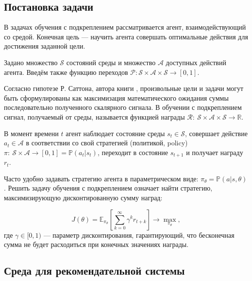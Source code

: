 \documentclass[14pt]{extarticle}
\begin{document}
\subsection{Постановка задачи}

В задачах обучения с подкреплением рассматривается агент, взаимодействующий со средой. Конечная цель --- научить агента совершать оптимальные действия для достижения заданной цели.

Задано множество $\mathcal{S}$ состояний среды и множество $\mathcal{A}$ доступных действий агента.
Введём также функцию переходов $\mathcal{P}: \mathcal{S} \times \mathcal{A} \times \mathcal{S} \rightarrow [0, 1]$.

Согласно гипотезе Р. Саттона, автора книги \cite{sutton_book}, произвольные цели и задачи могут быть сформулированы как максимизация математического ожидания суммы последовательно полученного скалярного сигнала. В обучении с подкреплением сигнал, получаемый от среды, называется функцией награды $\mathcal{R} :\ \mathcal{S} \times \mathcal{A} \times \mathcal{S} \rightarrow \mathbb{R}$.

В момент времени $t$ агент наблюдает состояние среды $s_t\in \mathcal{S}$, совершает действие $a_t\in \mathcal{A}$ в соответствии со свой стратегией (политикой, policy) $\pi:\ \mathcal{S} \times  \mathcal{A} \rightarrow [0, 1]= \mathbb{P}(a_t|s_t)$, переходит в состояние $s_{t+1}$ и получает награду $r_t$.

Часто удобно задавать стратегию агента в параметрическом виде:
$\pi_{\theta} = \mathbb{P} (a|s, \theta)$. 
Решить задачу обучения с подкреплением означает найти стратегию, максимизирующую дисконтированную сумму наград:

$$J(\theta) = \mathbb{E}_{\pi_{\theta}} \left[ \sum\limits_{k=0}^{\infty} \gamma^k r_{t+k}\right] \rightarrow \max_{\pi_{\theta}},$$
где $\gamma \in [0, 1)$ --- параметр дисконтирования, гарантирующий, что бесконечная сумма не будет расходиться при конечных значениях награды. 

\subsection{Среда для рекомендательной системы}
\end{document}
